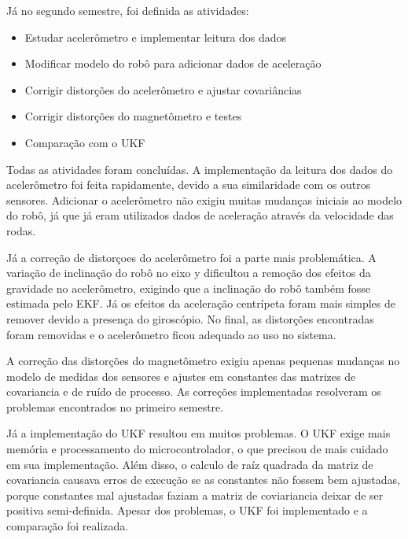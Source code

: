 \documentclass[
	12pt,				%
	openright,			%
	twoside,			%
	convert,
	a4paper,			%
	english,			%
	french,				%
	spanish,			%
	brazil				%
	]{abntex2}
\begin{document}
Já no segundo semestre, foi definida as atividades:
\begin{itemize}
	\item Estudar acelerômetro e implementar leitura dos dados
	\item Modificar modelo do robô para adicionar dados de aceleração
	\item Corrigir distorções do acelerômetro e ajustar covariâncias
	\item Corrigir distorções do magnetômetro e testes
	\item Comparação com o UKF
\end{itemize}
Todas as atividades foram concluídas. A implementação da leitura dos dados do acelerômetro foi feita rapidamente, devido a sua similaridade com os outros sensores. Adicionar o acelerômetro não exigiu muitas mudanças iniciais ao modelo do robô, já que já eram utilizados dados de aceleração através da velocidade das rodas.
\par
Já a correção de distorçoes do acelerômetro foi a parte mais problemática. A variação de inclinação do robô no eixo y dificultou a remoção dos efeitos da gravidade no acelerômetro, exigindo que a inclinação do robô também fosse estimada pelo EKF. Já os efeitos da aceleração centrípeta foram mais simples de remover devido a presença do giroscópio. No final, as distorções encontradas foram removidas e o acelerômetro ficou adequado ao uso no sistema.
\par
A correção das distorções do magnetômetro exigiu apenas pequenas mudanças no modelo de medidas dos sensores e ajustes em constantes das matrizes de covariancia e de ruído de processo. As correções implementadas resolveram os problemas encontrados no primeiro semestre.
\par
Já a implementação do UKF resultou em muitos problemas. O UKF exige mais memória e processamento do microcontrolador, o que precisou de mais cuidado em sua implementação. Além disso, o calculo de raíz quadrada da matriz de covariancia causava erros de execução se as constantes não fossem bem ajustadas, porque constantes mal ajustadas faziam a matriz de coviariancia deixar de ser positiva semi-definida. Apesar dos problemas, o UKF foi implementado e a comparação foi realizada.

\end{document}
